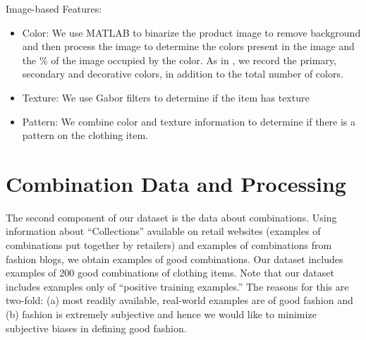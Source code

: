 Image-based Features:
\begin{itemize}
  \item Color: We use MATLAB to binarize the product image to remove background
  and then process the image to determine the colors present in the image and
  the \% of the image occupied by the color. As in \cite{}, we record the
  primary, secondary and decorative colors, in addition to the total number of
  colors.
  \item Texture: We use Gabor filters to determine if the item has texture
  \item Pattern: We combine color and texture information to determine if there
  is a pattern on the clothing item.
\end{itemize}

\section{Combination Data and Processing}

The second component of our dataset is the data about combinations. Using
information about ``Collections'' available on retail websites (examples of
combinations put together by retailers) and examples of combinations from
fashion blogs, we obtain examples of good combinations. Our dataset includes
examples of 200 good combinations of clothing items. Note that our dataset
includes examples only of ``positive training examples.'' The reasons for this
are two-fold: (a) most readily available, real-world examples are of good
fashion and (b) fashion is extremely subjective and hence we would like to
minimize subjective biases in defining good fashion.
